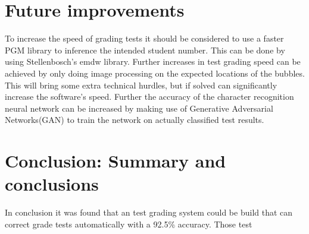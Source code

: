 \section{Future improvements}

To increase the speed of grading tests it should be considered to use a faster PGM library to inference the intended student number. This can be done by using Stellenbosch's emdw library. Further increases in test grading speed can be achieved by only doing image processing on the expected locations of the bubbles. This will bring some extra technical hurdles, but if solved can significantly increase the software's speed. Further the accuracy of the character recognition neural network can be increased by making use of Generative Adversarial Networks(GAN) to train the network on actually classified test results.

\section{Conclusion: Summary and conclusions}

In conclusion it was found that an test grading system could be build that can correct grade tests automatically with a 92.5\% accuracy. Those test

